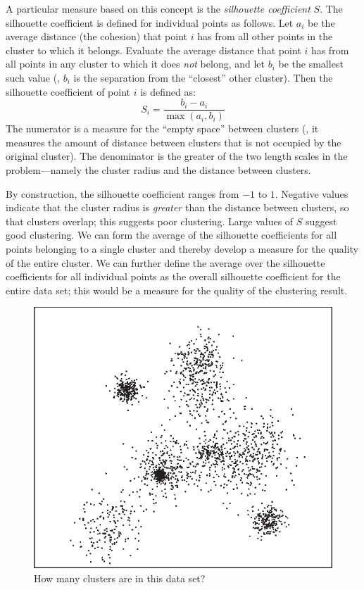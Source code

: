A particular measure based on this concept is the \emph{silhouette
  coefficient} $S$.  The silhouette coefficient is defined for
individual points as follows. Let $a_i$ be the average distance (the
cohesion) that point $i$ has from all other points in the cluster to
which it belongs. Evaluate the average distance that point $i$ has
from all points in any cluster to which it does \emph{not} belong, and
let $b_i$ be the smallest such value (\ie, $b_i$ is the separation from
the ``closest'' other cluster). Then the silhouette coefficient of
point $i$ is defined as:
%
\[
S_i = \frac{ b_i - a_i }{\max( a_i, b_i )}
\]
%
The numerator is a measure for the ``empty space'' between clusters
(\ie, it measures the amount of distance between clusters
that is not occupied by the original cluster). The denominator is the
greater of the two length scales in the problem---namely the cluster
radius and the distance between clusters.

By construction, the silhouette coefficient ranges from $-1$ to $1$.
Negative values indicate that the cluster radius is \emph{greater}
than the distance between clusters, so that clusters overlap; this
suggests poor clustering. Large values of $S$ suggest good clustering.
We can form the average of the silhouette coefficients for all points
belonging to a single cluster and thereby develop a measure for the
quality of the entire cluster. We can further define the average over
the silhouette coefficients for all individual points as the overall
silhouette coefficient for the entire data set; this would be a
measure for the quality of the clustering result.
      
\begin{figure}
  \centerline{\includegraphics{img/clustershop1}}
  \caption{How many clusters are in this data set?}
  \label{fig:silhouette1}\vspace*{-9pt}
\end{figure}

